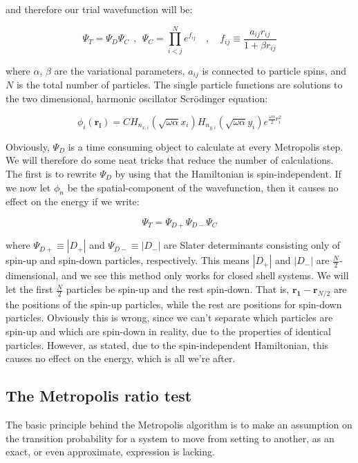 \documentclass[english, a4paper]{article}
\newcommand{\bm}[1]{\mathbf{#1}}
\begin{document}
	and therefore our trial wavefunction will be:
	
	\begin{equation}
	\Psi_T = \Psi_{D}\Psi_{C} \:\:,\:\: \Psi_{C} = \prod_{i<j}^N e^{f_{ij}}\quad,\quad f_{ij} \equiv\frac{a_{ij}r_{ij}}{1+\beta r_{ij}} \label{ManyBodyWavefunction}
	\end{equation}
	
	where $\alpha$, $\beta$ are the variational parameters, $a_{ij}$ is connected to particle spins, and $N$ is the total number of particles. The single particle functions are solutions to the two dimensional, harmonic oscillator Scr\"odinger equation:
	
	\begin{equation}
	\phi_i(\bm{r_i}) = C H_{n_{x,i}}(\sqrt{\omega \alpha}x_i)H_{n_{y,i}}(\sqrt{\omega \alpha}y_i)e^{\frac{\omega\alpha}{2}r_i^2}
	\end{equation}
	
	Obviously, $\Psi_{D}$ is a time consuming object to calculate at every Metropolis step. We will therefore do some neat tricks that reduce the number of calculations.\\
	The first is to rewrite $\Psi_D$ by using that the Hamiltonian is spin-independent. If we now let $\phi_n$ be the spatial-component of the wavefunction, then it causes no effect on the energy if we write:
	
	\begin{equation}
		\Psi_T = \Psi_{D+}\Psi_{D-}\Psi_C
	\end{equation}
	
	where $\Psi_{D+} \equiv |D_+|$ and $\Psi_{D-} \equiv |D_-|$ are Slater determinants consisting only of spin-up and spin-down particles, respectively. This means $|D_+|$ and $|D_-|$ are $\frac{N}{2}$-dimensional, and we see this method only works for closed shell systems. We will let the first $\frac{N}{2}$ particles be spin-up and the rest spin-down. That is, $\bm{r_1}-\bm{r}_{N/2}$ are the positions of the spin-up particles, while the rest are positions for spin-down particles. Obviously this is wrong, since we can't separate which particles are spin-up and which are spin-down in reality, due to the properties of identical particles. However, as stated, due to the spin-independent Hamiltonian, this causes no effect on the energy, which is all we're after.
	
	\subsection{The Metropolis ratio test}
	The basic principle behind the Metropolis algorithm is to make an assumption on the transition probability for a system to move from setting to another, as
	an exact, or even approximate, expression is lacking.
	
\end{document}
